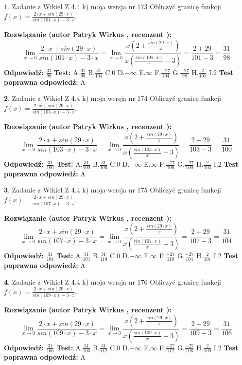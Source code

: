 \documentclass[12pt, a4paper]{article}
\theoremstyle{definition} %
\newtheorem{zad}{}
\newcommand{\zadStart}[1]{\begin{zad}#1\newline}
\newcommand{\zadStop}{\end{zad}}
\newcommand{\rozwStart}[2]{\noindent \textbf{Rozwiązanie (autor #1 , recenzent #2): }\newline}
\newcommand{\rozwStop}{\newline}
\newcommand{\odpStart}{\noindent \textbf{Odpowiedź:}\newline}
\newcommand{\odpStop}{\newline}
\newcommand{\testStart}{\noindent \textbf{Test:}\newline}
\newcommand{\testStop}{\newline}
\newcommand{\kluczStart}{\noindent \textbf{Test poprawna odpowiedź:}\newline}
\newcommand{\kluczStop}{\newline}
\begin{document}
\zadStart{Zadanie z Wikieł Z 4.4 k) moja wersja nr 173}
Obliczyć granicę funkcji $f(x)=\frac{2\cdot x +sin(29\cdot x)}{sin(101\cdot x) -3\cdot x}$.
\zadStop
\rozwStart{Patryk Wirkus}{}
$$\lim\limits_{x\to 0}\frac{2\cdot x +sin(29\cdot x)}{sin(101\cdot x) -3\cdot x}
=\lim\limits_{x\to 0}\frac{x(2+\frac{sin(29\cdot x)}{x})}{x(\frac{sin(101\cdot x)}{x}-3)}
=\frac{2+29}{101-3} = \frac{31}{98}$$
\rozwStop
\odpStart
$\frac{31}{98}$
\odpStop
\testStart
A.$\frac{31}{98}$
B.$\frac{31}{104}$
C.$0$
D.$-\infty$
E.$\infty$
F.$\frac{-27}{104}$
G.$\frac{-27}{98}$
H.$\frac{2}{101}$
I.$2$
\testStop
\kluczStart
A
\kluczStop



\zadStart{Zadanie z Wikieł Z 4.4 k) moja wersja nr 174}
Obliczyć granicę funkcji $f(x)=\frac{2\cdot x +sin(29\cdot x)}{sin(103\cdot x) -3\cdot x}$.
\zadStop
\rozwStart{Patryk Wirkus}{}
$$\lim\limits_{x\to 0}\frac{2\cdot x +sin(29\cdot x)}{sin(103\cdot x) -3\cdot x}
=\lim\limits_{x\to 0}\frac{x(2+\frac{sin(29\cdot x)}{x})}{x(\frac{sin(103\cdot x)}{x}-3)}
=\frac{2+29}{103-3} = \frac{31}{100}$$
\rozwStop
\odpStart
$\frac{31}{100}$
\odpStop
\testStart
A.$\frac{31}{100}$
B.$\frac{31}{106}$
C.$0$
D.$-\infty$
E.$\infty$
F.$\frac{-27}{106}$
G.$\frac{-27}{100}$
H.$\frac{2}{103}$
I.$2$
\testStop
\kluczStart
A
\kluczStop



\zadStart{Zadanie z Wikieł Z 4.4 k) moja wersja nr 175}
Obliczyć granicę funkcji $f(x)=\frac{2\cdot x +sin(29\cdot x)}{sin(107\cdot x) -3\cdot x}$.
\zadStop
\rozwStart{Patryk Wirkus}{}
$$\lim\limits_{x\to 0}\frac{2\cdot x +sin(29\cdot x)}{sin(107\cdot x) -3\cdot x}
=\lim\limits_{x\to 0}\frac{x(2+\frac{sin(29\cdot x)}{x})}{x(\frac{sin(107\cdot x)}{x}-3)}
=\frac{2+29}{107-3} = \frac{31}{104}$$
\rozwStop
\odpStart
$\frac{31}{104}$
\odpStop
\testStart
A.$\frac{31}{104}$
B.$\frac{31}{110}$
C.$0$
D.$-\infty$
E.$\infty$
F.$\frac{-27}{110}$
G.$\frac{-27}{104}$
H.$\frac{2}{107}$
I.$2$
\testStop
\kluczStart
A
\kluczStop



\zadStart{Zadanie z Wikieł Z 4.4 k) moja wersja nr 176}
Obliczyć granicę funkcji $f(x)=\frac{2\cdot x +sin(29\cdot x)}{sin(109\cdot x) -3\cdot x}$.
\zadStop
\rozwStart{Patryk Wirkus}{}
$$\lim\limits_{x\to 0}\frac{2\cdot x +sin(29\cdot x)}{sin(109\cdot x) -3\cdot x}
=\lim\limits_{x\to 0}\frac{x(2+\frac{sin(29\cdot x)}{x})}{x(\frac{sin(109\cdot x)}{x}-3)}
=\frac{2+29}{109-3} = \frac{31}{106}$$
\rozwStop
\odpStart
$\frac{31}{106}$
\odpStop
\testStart
A.$\frac{31}{106}$
B.$\frac{31}{112}$
C.$0$
D.$-\infty$
E.$\infty$
F.$\frac{-27}{112}$
G.$\frac{-27}{106}$
H.$\frac{2}{109}$
I.$2$
\testStop
\kluczStart
A
\kluczStop
\end{document}
